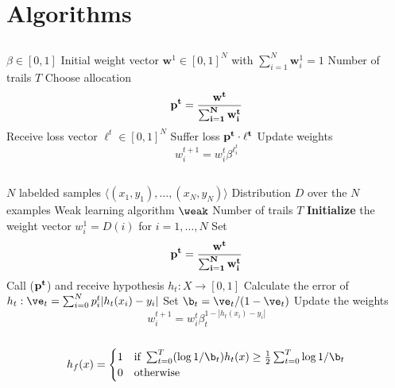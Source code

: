 
\chapter{Algorithms}
\label{app:algo}

\section{\hedge}
\label{app:hedge}

\begin{algorithm}
\caption{\hedge}
\begin{algorithmic}[1]
\Require 
\Statex $\beta\in [0,1]$
\Statex Initial weight vector $\mathbf{w}^1\in [0,1]^N$ with $\sum_{i=1}^N \mathbf{w}^1_i=1$
\Statex Number of trails $T$
\State Choose allocation $$\bf p^t= \frac{\bf w^t}{\sum_{i=1}^N \mathbf{w}^t_i}$$
\State Receive loss vector $\ell^t\in[0,1]^N$
\State Suffer loss $\bf p^t\cdot \ell^t$
\State Update weights $$w^{t+1}_i=w^t_i\beta^{\ell_{i}^{t}}$$
\EndFor
\EndProcedure
\end{algorithmic}
\end{algorithm}
\newpage
\section{\adaB}
\label{app:adaB}

\begin{algorithm} 
\caption{\adaB}
\begin{algorithmic}[1]
\Require 
\Statex $N$ labelded samples $\langle (x_1,y_1),\ldots,(x_N,y_N)\rangle$
\Statex Distribution $D$ over the $N$ examples
\Statex Weak learning algorithm $\weak$
\Statex Number of trails $T$
\State \textbf{Initialize} the weight vector $w_i^1=D(i)$ for $i=1,\ldots,N$
\State Set $$\bf p^t= \frac{\bf w^t}{\sum_{i=1}^N \mathbf{w}^t_i}$$
\State Call \weak($\bf p^t$) and receive hypothesis $h_t:X\to [0,1]$
\State Calculate the error of $h_t:\ve_t=\sum^N_{i=0}p^t_i|h_t(x_i)-y_i|$
\State Set $\b_t=\ve_t/(1-\ve_t)$
\State Update the weights $$w^{t+1}_i=w^t_i\beta^{1-|h_t(x_i)-y_i|}_t$$
\EndFor\\
\Return $$h_f(x)=\begin{cases}1 & \text{if } \sum^T_{t=0}(\log1/\b_t)h_t(x)\geq\frac12\sum^T_{t=0}\log1/\b_t\\0&\text{otherwise}\end{cases}$$
\EndProcedure
\end{algorithmic}
\end{algorithm}